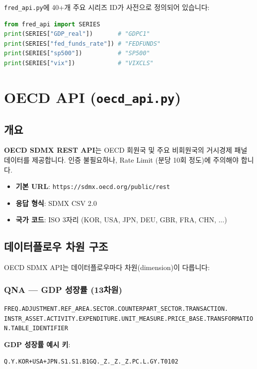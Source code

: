\documentclass[11pt,a4paper]{article}
\newcommand{\apibox}[1]{%
    \noindent\colorbox{lightaccent}{\parbox{\dimexpr\textwidth-2\fboxsep}{%
        \small\texttt{#1}%
    }}%
    \vspace{0.5em}%
}
\newcommand{\code}[1]{\texttt{#1}}
\newcommand{\file}[1]{\texttt{\textcolor{string}{#1}}}
\begin{document}
\file{fred\_api.py}에 40+개 주요 시리즈 ID가 사전으로 정의되어 있습니다:

\begin{lstlisting}[language=Python]
from fred_api import SERIES
print(SERIES["GDP_real"])       # "GDPC1"
print(SERIES["fed_funds_rate"]) # "FEDFUNDS"
print(SERIES["sp500"])          # "SP500"
print(SERIES["vix"])            # "VIXCLS"
\end{lstlisting}


\section{OECD API (\file{oecd\_api.py})}

\subsection{개요}

\textbf{OECD SDMX REST API}는 OECD 회원국 및 주요 비회원국의 거시경제 패널 데이터를 제공합니다.
인증 불필요하나, Rate Limit (분당 10회 정도)에 주의해야 합니다.

\begin{itemize}[leftmargin=2em]
    \item \textbf{기본 URL}: \code{https://sdmx.oecd.org/public/rest}
    \item \textbf{응답 형식}: SDMX CSV 2.0
    \item \textbf{국가 코드}: ISO 3자리 (KOR, USA, JPN, DEU, GBR, FRA, CHN, ...)
\end{itemize}

\subsection{데이터플로우 차원 구조}

OECD SDMX API는 데이터플로우마다 차원(dimension)이 다릅니다:

\subsubsection{QNA --- GDP 성장률 (13차원)}

\apibox{FREQ.ADJUSTMENT.REF\_AREA.SECTOR.COUNTERPART\_SECTOR.TRANSACTION.\\
INSTR\_ASSET.ACTIVITY.EXPENDITURE.UNIT\_MEASURE.PRICE\_BASE.TRANSFORMATION.TABLE\_IDENTIFIER}

\textbf{GDP 성장률 예시 키}:
\begin{lstlisting}
Q.Y.KOR+USA+JPN.S1.S1.B1GQ._Z._Z._Z.PC.L.GY.T0102
\end{lstlisting}
\end{document}
